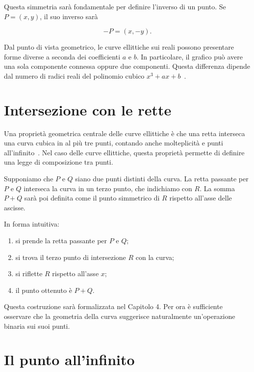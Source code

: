 \documentclass[12pt,a4paper,oneside]{report}
\begin{document}
Questa simmetria sarà fondamentale per definire l'inverso di un punto. Se \(P=(x,y)\), il suo inverso sarà

\begin{equation}
    -P = (x,-y).
\end{equation}

Dal punto di vista geometrico, le curve ellittiche sui reali possono presentare forme diverse a seconda dei coefficienti \(a\) e \(b\). In particolare, il grafico può avere una sola componente connessa oppure due componenti. Questa differenza dipende dal numero di radici reali del polinomio cubico \(x^3+ax+b\)~\cite{margara_ec}.

\section{Intersezione con le rette}

Una proprietà geometrica centrale delle curve ellittiche è che una retta interseca una curva cubica in al più tre punti, contando anche molteplicità e punti all'infinito~\cite{margara_ec}. Nel caso delle curve ellittiche, questa proprietà permette di definire una legge di composizione tra punti.

Supponiamo che \(P\) e \(Q\) siano due punti distinti della curva. La retta passante per \(P\) e \(Q\) interseca la curva in un terzo punto, che indichiamo con \(R\). La somma \(P+Q\) sarà poi definita come il punto simmetrico di \(R\) rispetto all'asse delle ascisse.

In forma intuitiva:

\begin{enumerate}
    \item si prende la retta passante per \(P\) e \(Q\);
    \item si trova il terzo punto di intersezione \(R\) con la curva;
    \item si riflette \(R\) rispetto all'asse \(x\);
    \item il punto ottenuto è \(P+Q\).
\end{enumerate}

Questa costruzione sarà formalizzata nel Capitolo 4. Per ora è sufficiente osservare che la geometria della curva suggerisce naturalmente un'operazione binaria sui suoi punti.

\section{Il punto all'infinito}
\end{document}
